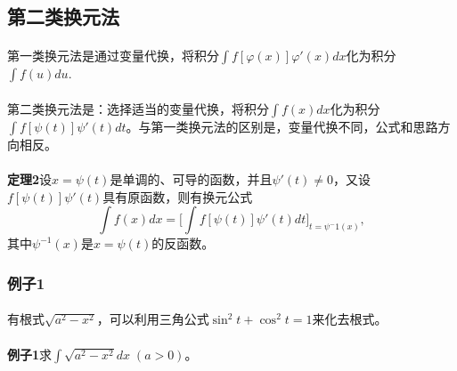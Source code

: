 \subsection{第二类换元法}
\paragraph{}
第一类换元法是通过变量代换，将积分$\displaystyle\int{f[\varphi(x)]\varphi'(x)dx}$化为积分$\displaystyle\int{f(u)du}$.

\paragraph{}
第二类换元法是：选择适当的变量代换，将积分$\displaystyle\int{f(x)dx}$化为积分$\displaystyle\int{f[\psi(t)]\psi'(t)dt}$。与第一类换元法的区别是，变量代换不同，公式和思路方向相反。

\paragraph{}
\textbf{定理2\;}设$x=\psi(t)$是单调的、可导的函数，并且$\psi'(t)\neq 0$，又设$f[\psi(t)]\psi'(t)$具有原函数，则有换元公式
\begin{equation}
  \int f(x)dx = \big[\int f[\psi(t)]\psi'(t)dt\big]_{t=\psi^-1(x)},
\end{equation}
其中$\psi^{-1}(x)$是$x=\psi(t)$的反函数。

\subsubsection{例子1}
\paragraph{}
有根式$\sqrt{a^2 - x^2}$，可以利用三角公式$\sin^2t+\cos^2t=1$来化去根式。

\paragraph{}
\textbf{例子1\;}求$\displaystyle \int\sqrt{a^2 - x^2}dx \; (a > 0)$。

